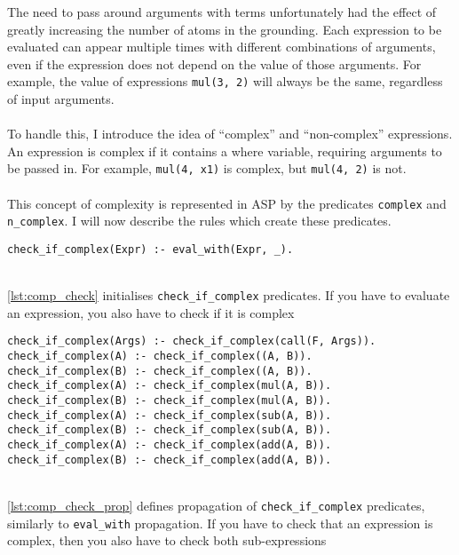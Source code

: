 The need to pass around arguments with terms unfortunately had the effect of greatly increasing the number of atoms in the grounding. Each expression to be evaluated can appear multiple times with different combinations of arguments, even if the expression does not depend on the value of those arguments. For example, the value of expressions \lstinline!mul(3, 2)! will always be the same, regardless of input arguments. \\ \\
To handle this, I introduce the idea of ``complex'' and ``non-complex'' expressions. An expression is complex if it contains a where variable, requiring arguments to be passed in. For example, \lstinline!mul(4, x1)! is complex, but \lstinline!mul(4, 2)! is not. \\ \\
This concept of complexity is represented in ASP by the predicates \lstinline!complex! and \lstinline!n_complex!. I will now describe the rules which create these predicates.\\

\begin{lstlisting}[caption={Check for complexity}, label={lst:comp_check}, firstnumber=88]
check_if_complex(Expr) :- eval_with(Expr, _).
\end{lstlisting}
\mbox{} \\
\ref{lst:comp_check} initialises \lstinline!check_if_complex! predicates. If you have to evaluate an expression, you also have to check if it is complex \\

\begin{lstlisting}[caption={Checking propagation}, label={lst:comp_check_prop}, firstnumber=90]
check_if_complex(Args) :- check_if_complex(call(F, Args)).
check_if_complex(A) :- check_if_complex((A, B)).
check_if_complex(B) :- check_if_complex((A, B)).
check_if_complex(A) :- check_if_complex(mul(A, B)).
check_if_complex(B) :- check_if_complex(mul(A, B)).
check_if_complex(A) :- check_if_complex(sub(A, B)).
check_if_complex(B) :- check_if_complex(sub(A, B)).
check_if_complex(A) :- check_if_complex(add(A, B)).
check_if_complex(B) :- check_if_complex(add(A, B)).
\end{lstlisting}
\mbox{} \\
\ref{lst:comp_check_prop} defines propagation of \lstinline!check_if_complex! predicates, similarly to \lstinline!eval_with! propagation. If you have to check that an expression is complex, then you also have to check both sub-expressions\\

